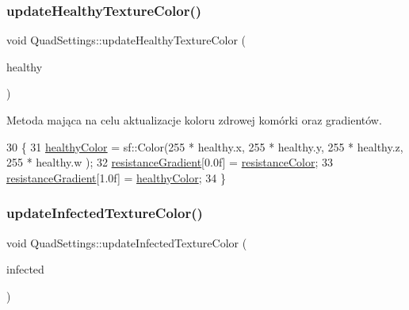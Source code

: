 \subsubsection{\texorpdfstring{update\+Healthy\+Texture\+Color()}{updateHealthyTextureColor()}}
{\footnotesize\ttfamily void Quad\+Settings\+::update\+Healthy\+Texture\+Color (\begin{DoxyParamCaption}\item[{Im\+Vec4}]{healthy }\end{DoxyParamCaption})}

Metoda mająca na celu aktualizacje koloru zdrowej komórki oraz gradientów. 
\begin{DoxyCode}
30 \{
31     \mbox{\hyperlink{class_quad_settings_ad170bfeb3a4bc5157107cc07eba36067}{healthyColor}} = sf::Color(255 * healthy.x, 255 * healthy.y, 255 * healthy.z, 255 * healthy.w
      );
32     \mbox{\hyperlink{class_quad_settings_ac6dde1c3756bc222b42b68d8cb1beba0}{resistanceGradient}}[0.0f] = \mbox{\hyperlink{class_quad_settings_a9d813ff930e92de96045aa982b99b177}{resistanceColor}};
33     \mbox{\hyperlink{class_quad_settings_ac6dde1c3756bc222b42b68d8cb1beba0}{resistanceGradient}}[1.0f] = \mbox{\hyperlink{class_quad_settings_ad170bfeb3a4bc5157107cc07eba36067}{healthyColor}};
34 \}
\end{DoxyCode}
\mbox{\label{class_quad_settings_aa880429606846a5d629a334859ae0f37}} 
\subsubsection{\texorpdfstring{update\+Infected\+Texture\+Color()}{updateInfectedTextureColor()}}
{\footnotesize\ttfamily void Quad\+Settings\+::update\+Infected\+Texture\+Color (\begin{DoxyParamCaption}\item[{Im\+Vec4}]{infected }\end{DoxyParamCaption})}

